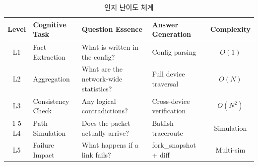 \begin{table}[!t]
  \caption{인지 난이도 체계}
  \label{tab:difficulty_taxonomy}
  \centering
  \small
  \begin{tabular}{clllc}
    \toprule
    \textbf{Level} & \textbf{Cognitive Task} & \textbf{Question Essence} & \textbf{Answer Generation} & \textbf{Complexity} \\
    \midrule
    L1 & Fact Extraction    & What is written in the config?       & Config parsing              & $O(1)$   \\
    L2 & Aggregation        & What are the network-wide statistics? & Full device traversal       & $O(N)$   \\
    L3 & Consistency Check  & Any logical contradictions?           & Cross-device verification   & $O(N^2)$ \\
    \cmidrule(lr){1-5}
    L4 & Path Simulation    & Does the packet actually arrive?      & Batfish traceroute          & Simulation \\
    L5 & Failure Impact     & What happens if a link fails?         & fork\_snapshot + diff       & Multi-sim  \\
    \bottomrule
  \end{tabular}
\end{table}
